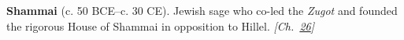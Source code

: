 \textbf{Shammai} (c. 50 BCE–c. 30 CE). Jewish sage who co-led the \emph{Zugot} and founded the rigorous House of Shammai in opposition to Hillel. \emph{[Ch.~\hyperref[ch:jewishcalendar]{26}]}

